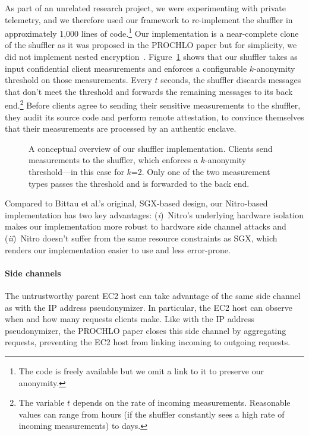 As part of an unrelated research project, we were experimenting with private
telemetry, and we therefore used our framework to re-implement the shuffler in
approximately 1,000 lines of code.\footnote{The code is freely available but we
omit a link to it to preserve our anonymity.}  Our implementation is a
near-complete clone of the shuffler as it was proposed in the PROCHLO paper but
for simplicity, we did not implement nested encryption~\cite[\S~3]{Bittau2017a}.
Figure~\ref{fig:shuffler} shows that our shuffler takes as input confidential
client measurements and enforces a configurable $k$-anonymity threshold on those
measurements.  Every $t$ seconds, the shuffler discards messages that don't meet
the threshold and forwards the remaining messages to its back end.\footnote{The
variable $t$ depends on the rate of incoming measurements.  Reasonable values
can range from hours (if the shuffler constantly sees a high rate of incoming
measurements) to days.} Before clients agree to sending their sensitive
measurements to the shuffler, they audit its source code and perform remote
attestation, to convince themselves that their measurements are processed by an
authentic enclave.

\begin{figure}[t]
\centering

\caption{A conceptual overview of our shuffler implementation.  Clients send
  measurements to the shuffler, which enforces a $k$-anonymity threshold---in
  this case for $k$=2. Only one of the two measurement types passes the
  threshold and is forwarded to the back end.}
\label{fig:shuffler}
\end{figure}

Compared to Bittau et al.'s original, SGX-based design, our Nitro-based
implementation has two key advantages: (\emph{i})~Nitro's underlying hardware
isolation makes our implementation more robust to hardware side channel attacks
and (\emph{ii})~Nitro doesn't suffer from the same resource constraints as SGX,
which renders our implementation easier to use and less error-prone.

\paragraph{Side channels}
The untrustworthy parent EC2 host can take advantage of the same side
channel as with the IP address pseudonymizer.  In particular, the EC2 host
can observe when and how many requests clients make.  Like with the IP address
pseudonymizer, the PROCHLO paper closes this side channel by aggregating
requests, preventing the EC2 host from linking incoming to outgoing
requests.
